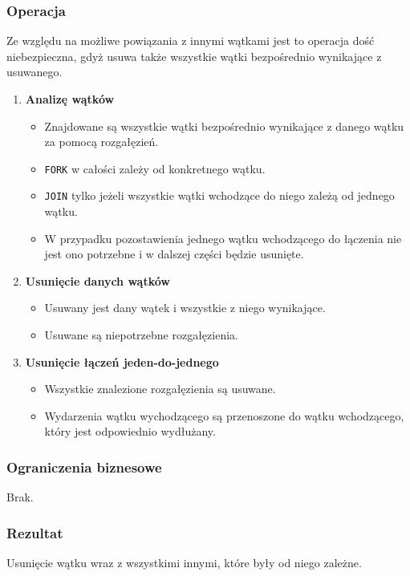\subsubsection{Operacja}
Ze względu na możliwe powiązania z innymi wątkami jest to operacja dość niebezpieczna, gdyż usuwa także wszystkie wątki bezpośrednio wynikające z usuwanego. 
\begin{enumerate}
    \item \textbf{Analizę wątków}
    \begin{itemize}
        \item Znajdowane są wszystkie wątki bezpośrednio wynikające z danego wątku za pomocą rozgałęzień.
        \item \texttt{FORK} w całości zależy od konkretnego wątku.
        \item \texttt{JOIN} tylko jeżeli wszystkie wątki wchodzące do niego zależą od jednego wątku.
        \item W przypadku pozostawienia jednego wątku wchodzącego do łączenia nie jest ono potrzebne i w dalszej części będzie usunięte.
    \end{itemize}
    \item \textbf{Usunięcie danych wątków}
    \begin{itemize}
        \item Usuwany jest dany wątek i wszystkie z niego wynikające.
        \item Usuwane są niepotrzebne rozgałęzienia.
    \end{itemize}
    \item \textbf{Usunięcie łączeń jeden-do-jednego}
    \begin{itemize}
        \item Wszystkie znalezione rozgałęzienia są usuwane.
        \item Wydarzenia wątku wychodzącego są przenoszone do wątku wchodzącego, który jest odpowiednio wydłużany.
    \end{itemize}
\end{enumerate}

\subsubsection{Ograniczenia biznesowe}
Brak.

\subsubsection{Rezultat}
Usunięcie wątku wraz z wszystkimi innymi, które były od niego zależne.

